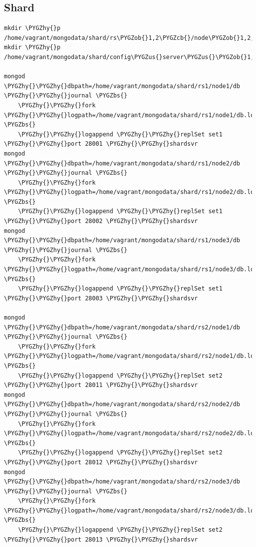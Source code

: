 \documentclass[a4paper,10pt,english]{sphinxmanual}
\def\PYGZbs{\char`\\}
\def\PYGZus{\char`\_}
\def\PYGZob{\char`\{}
\def\PYGZcb{\char`\}}
\def\PYGZhy{\char`\-}
\begin{document}
\subsection{Shard}
\label{contents/ejemplosDesplieguesLocal:shard}
\begin{Verbatim}[commandchars=\\\{\}]
mkdir \PYGZhy{}p /home/vagrant/mongodata/shard/rs\PYGZob{}1,2\PYGZcb{}/node\PYGZob{}1,2,3\PYGZcb{}/db
mkdir \PYGZhy{}p /home/vagrant/mongodata/shard/config\PYGZus{}server\PYGZus{}\PYGZob{}1,2,3\PYGZcb{}

mongod \PYGZhy{}\PYGZhy{}dbpath=/home/vagrant/mongodata/shard/rs1/node1/db \PYGZhy{}\PYGZhy{}journal \PYGZbs{}
    \PYGZhy{}\PYGZhy{}fork \PYGZhy{}\PYGZhy{}logpath=/home/vagrant/mongodata/shard/rs1/node1/db.log \PYGZbs{}
    \PYGZhy{}\PYGZhy{}logappend \PYGZhy{}\PYGZhy{}replSet set1 \PYGZhy{}\PYGZhy{}port 28001 \PYGZhy{}\PYGZhy{}shardsvr
mongod \PYGZhy{}\PYGZhy{}dbpath=/home/vagrant/mongodata/shard/rs1/node2/db \PYGZhy{}\PYGZhy{}journal \PYGZbs{}
    \PYGZhy{}\PYGZhy{}fork \PYGZhy{}\PYGZhy{}logpath=/home/vagrant/mongodata/shard/rs1/node2/db.log \PYGZbs{}
    \PYGZhy{}\PYGZhy{}logappend \PYGZhy{}\PYGZhy{}replSet set1 \PYGZhy{}\PYGZhy{}port 28002 \PYGZhy{}\PYGZhy{}shardsvr
mongod \PYGZhy{}\PYGZhy{}dbpath=/home/vagrant/mongodata/shard/rs1/node3/db \PYGZhy{}\PYGZhy{}journal \PYGZbs{}
    \PYGZhy{}\PYGZhy{}fork \PYGZhy{}\PYGZhy{}logpath=/home/vagrant/mongodata/shard/rs1/node3/db.log \PYGZbs{}
    \PYGZhy{}\PYGZhy{}logappend \PYGZhy{}\PYGZhy{}replSet set1 \PYGZhy{}\PYGZhy{}port 28003 \PYGZhy{}\PYGZhy{}shardsvr

mongod \PYGZhy{}\PYGZhy{}dbpath=/home/vagrant/mongodata/shard/rs2/node1/db \PYGZhy{}\PYGZhy{}journal \PYGZbs{}
    \PYGZhy{}\PYGZhy{}fork \PYGZhy{}\PYGZhy{}logpath=/home/vagrant/mongodata/shard/rs2/node1/db.log \PYGZbs{}
    \PYGZhy{}\PYGZhy{}logappend \PYGZhy{}\PYGZhy{}replSet set2 \PYGZhy{}\PYGZhy{}port 28011 \PYGZhy{}\PYGZhy{}shardsvr
mongod \PYGZhy{}\PYGZhy{}dbpath=/home/vagrant/mongodata/shard/rs2/node2/db \PYGZhy{}\PYGZhy{}journal \PYGZbs{}
    \PYGZhy{}\PYGZhy{}fork \PYGZhy{}\PYGZhy{}logpath=/home/vagrant/mongodata/shard/rs2/node2/db.log \PYGZbs{}
    \PYGZhy{}\PYGZhy{}logappend \PYGZhy{}\PYGZhy{}replSet set2 \PYGZhy{}\PYGZhy{}port 28012 \PYGZhy{}\PYGZhy{}shardsvr
mongod \PYGZhy{}\PYGZhy{}dbpath=/home/vagrant/mongodata/shard/rs2/node3/db \PYGZhy{}\PYGZhy{}journal \PYGZbs{}
    \PYGZhy{}\PYGZhy{}fork \PYGZhy{}\PYGZhy{}logpath=/home/vagrant/mongodata/shard/rs2/node3/db.log \PYGZbs{}
    \PYGZhy{}\PYGZhy{}logappend \PYGZhy{}\PYGZhy{}replSet set2 \PYGZhy{}\PYGZhy{}port 28013 \PYGZhy{}\PYGZhy{}shardsvr


\end{Verbatim}
\end{document}
